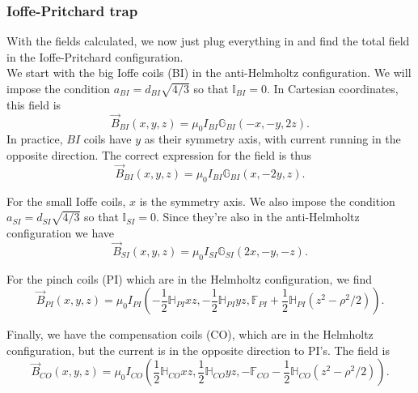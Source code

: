 \documentclass{article}
\theoremstyle{definition}
\newcommand{\f}[2]{\frac{#1}{#2}}
\newcommand{\lp}{\left(}
\newcommand{\rp}{\right)}
\begin{document}
\subsubsection{Ioffe-Pritchard trap}
With the fields calculated, we now just plug everything in and find the total field in the Ioffe-Pritchard configuration. \\

We start with the big Ioffe coils (BI) in the anti-Helmholtz configuration. We will impose the condition $a_{BI} = d_{BI}\sqrt{4/3}$ so that $\mathbb{I}_{BI} = 0$. In Cartesian coordinates, this field is 
\begin{equation*}
\vec{B}_{BI}(x,y,z) = \mu_0 I_{BI} \mathbb{G}_{BI}(-x,-y,2z ).
\end{equation*}
In practice, $BI$ coils have $y$ as their symmetry axis, with current running in the opposite direction. The correct expression for the field is thus 
\begin{equation*}
\vec{B}_{BI}(x,y,z) = \mu_0 I_{BI} \mathbb{G}_{BI}(x,-2y,z).
\end{equation*}

For the small Ioffe coils, $x$ is the symmetry axis. We also impose the condition $a_{SI} = d_{SI}\sqrt{4/3}$ so that $\mathbb{I}_{SI} = 0$. Since they're also in the anti-Helmholtz configuration we have
\begin{equation*}
\vec{B}_{SI}(x,y,z) = \mu_0 I_{SI} \mathbb{G}_{SI} (2x,-y,-z).
\end{equation*}

For the pinch coils (PI) which are in the Helmholtz configuration, we find 
\begin{equation*}
\vec{B}_{PI}(x,y,z) = \mu_0 I_{PI} \lp -\f{1}{2}\mathbb{H}_{PI}xz,  -\f{1}{2}\mathbb{H}_{PI}yz, \mathbb{F}_{PI} + \f{1}{2}\mathbb{H}_{PI} \lp z^2 - \rho^2/2 \rp \rp.
\end{equation*}

Finally, we have the compensation coils (CO), which are in the Helmholtz configuration, but the current is in the opposite direction to PI's. The field is 
\begin{equation*}
\vec{B}_{CO}(x,y,z) = \mu_0 I_{CO} \lp \f{1}{2}\mathbb{H}_{CO}xz,  \f{1}{2}\mathbb{H}_{CO}yz, -\mathbb{F}_{CO} - \f{1}{2}\mathbb{H}_{CO} \lp z^2 - \rho^2/2 \rp \rp.
\end{equation*}
\end{document}
